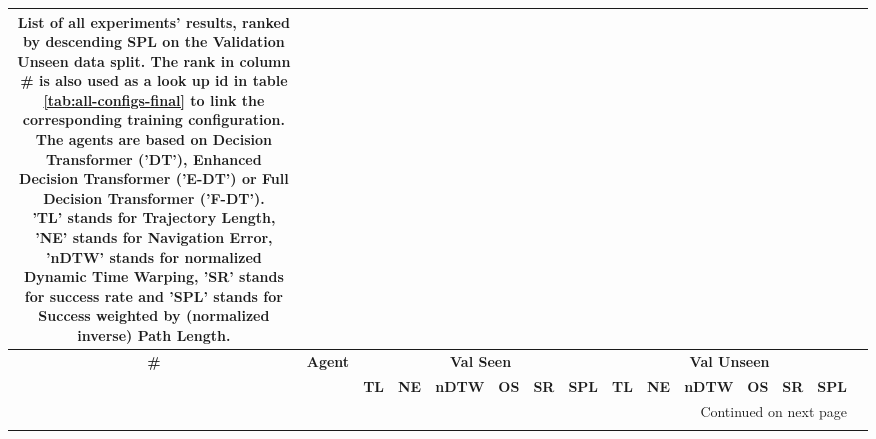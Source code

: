 \begin{longtable}{@{\hskip3pt}c@{\hskip3pt}c@{\hskip3pt}c@{\hskip3pt}c@{\hskip3pt}c@{\hskip3pt}c@{\hskip3pt}c@{\hskip3pt}c@{\hskip3pt}c@{\hskip3pt}c@{\hskip3pt}c@{\hskip3pt}c@{\hskip3pt}c@{\hskip3pt}c@{\hskip3pt}c}
\caption{List of all experiments' results, ranked by descending SPL on the Validation Unseen data split. The rank in column \# is also used as a look up id in table \ref{tab:all-configs-final} to link the corresponding training configuration. \newline The agents are based on Decision Transformer ('DT'), Enhanced Decision Transformer ('E-DT') or Full Decision Transformer ('F-DT').\newline 'TL' stands for Trajectory Length, 'NE' stands for Navigation Error, 'nDTW' stands for normalized Dynamic Time Warping, 'SR' stands for success rate and 'SPL' stands for  Success weighted by (normalized inverse) Path Length.}\\
\toprule
\textbf{\#} & \textbf{Agent} & \multicolumn{6}{c}{\textbf{Val Seen}} & \multicolumn{6}{c}{\textbf{Val Unseen}} \\
\cmidrule(l){3-8} \cmidrule(l){9-14} \textbf{~} &     \textbf{~} &       \textbf{TL} & \textbf{NE} & \textbf{nDTW} & \textbf{OS} & \textbf{SR} & \textbf{SPL} &         \textbf{TL} & \textbf{NE} & \textbf{nDTW} & \textbf{OS} & \textbf{SR} & \textbf{SPL} \\
\midrule
\endhead
\midrule
\multicolumn{14}{r}{{Continued on next page}} \\
\midrule
\endfoot


\end{longtable}
